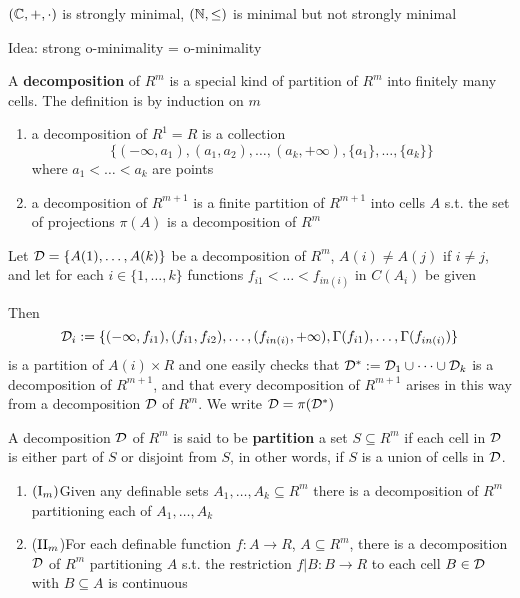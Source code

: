 \documentclass[11pt]{article}
\begin{document}
\begin{fact}[]
\((\mathbb{C},+,\cdot)\) is strongly minimal, \((\mathbb{N},\le)\) is minimal but not strongly minimal
\end{fact}

Idea: strong o-minimality = o-minimality


\begin{definition}[]
A \textbf{decomposition} of \(R^m\) is a special kind of partition of \(R^m\) into finitely many cells. The
definition is by induction on \(m\)
\begin{enumerate}
\item a decomposition of \(R^1=R\) is a collection
\begin{equation*}
\{(-\infty,a_1),(a_1,a_2),\dots,(a_k,+\infty),\{a_1\},\dots,\{a_k\}\}
\end{equation*}
where \(a_1<\dots<a_k\) are points
\item a decomposition of \(R^{m+1}\) is a finite partition of \(R^{m+1}\) into cells \(A\) s.t. the
set of projections \(\pi(A)\) is a decomposition of \(R^m\)
\end{enumerate}
\end{definition}

Let \(\mathcal{D}=\{A(1),\dots,A(k)\}\) be a decomposition of \(R^m\), \(A(i)\neq A(j)\) if \(i\neq j\), and let for
each \(i\in\{1,\dots,k\}\) functions \(f_{i1}<\dots<f_{in(i)}\) in \(C(A_i)\) be given

Then
\begin{equation*}
\mathcal{D}_i:=\{(-\infty,f_{i1}),(f_{i1},f_{i2}),\dots,(f_{in(i)},+\infty),\Gamma(f_{i1}),\dots,\Gamma(f_{in(i)})\}
\end{equation*}
is a partition of \(A(i)\times R\) and one easily checks that \(\mathcal{D}^*:=\mathcal{D}_1\cup\dots\cup\mathcal{D}_k\) is a decomposition
of \(R^{m+1}\), and that every decomposition of \(R^{m+1}\) arises in this way from a
decomposition \(\mathcal{D}\) of \(R^m\). We write \(\mathcal{D}=\pi(\mathcal{D}^*)\)

A decomposition \(\mathcal{D}\) of \(R^m\) is said to be \textbf{partition} a set \(S\subseteq R^m\) if each cell in \(\mathcal{D}\) is
either part of \(S\) or disjoint from \(S\), in other words, if \(S\) is a union of cells
in \(\mathcal{D}\).

\begin{theorem}
\begin{enumerate}
\item \((\text{\rom{1}}_m)\)Given any definable sets \(A_1,\dots,A_k\subseteq R^m\) there is a decomposition of \(R^m\) partitioning
each of \(A_1,\dots,A_k\)
\item (\(\text{\rom{2}}_m\))For each definable function \(f:A\to R\), \(A\subseteq R^m\), there is a decomposition \(\mathcal{D}\) of \(R^m\)
partitioning \(A\) s.t. the restriction \(f|B:B\to R\) to each cell \(B\in\mathcal{D}\) with \(B\subseteq A\) is continuous
\end{enumerate}
\end{theorem}
\end{document}
